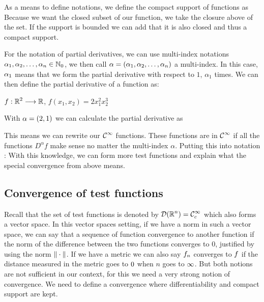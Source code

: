\documentclass[11pt, openright]{book}
\begin{document}
As a means to define notations, we define the compact support of functions as
Because we want the closed subset of our function, we take the closure above of the set. If the support is bounded we can add that it is also closed and thus a compact support.

For the notation of partial derivatives, we can use multi-index notations $\displaystyle{\alpha_1,\alpha_2,\ldots,\alpha_n \in \mathbb{N}_0}$, we then call $\displaystyle{\alpha = (\alpha_1,\alpha_2,\ldots,\alpha_n)}$ a multi-index. In this case, $\displaystyle{\alpha_1}$ means that we form the partial derivative with respect to $1$, $\alpha_1$ times. We can then define the partial derivative of a function as:

\begin{example}
    $\displaystyle{f: \mathbb{R}^2 \longrightarrow \mathbb{R}}$, $f(x_1,x_2)=2x_{1}^{2}x_{2}^{3}$

    With $\displaystyle{\alpha=(2,1)}$ we can calculate the partial derivative as
\end{example}

This means we can rewrite our $\displaystyle{\mathcal{C}^{\infty}}$ functions. These functions are in $\displaystyle{\mathcal{C}^{\infty}}$ if all the functions $D^\alpha f$ make sense no matter the multi-index $\alpha$. Putting this into notation :
With this knowledge, we can form more test functions and explain what the special convergence from above means.

\subsection{Convergence of test functions}

Recall that the set of test functions is denoted by $\displaystyle{\mathcal{D}(\mathbb{R}^n)=\mathcal{C}^{\infty}_{c}}$ which also forms a vector space. In this vector spaces setting, if we have a norm in such a vector space, we can say that a sequence of function convergence to another function if the norm of the difference between the two functions converges to $0$, justified by using the norm $\displaystyle{\|\cdot \|}$.
If we have a metric we can also say $\displaystyle{f_n }$ converges to $\displaystyle{f }$ if the distance measured in the metric goes to $\displaystyle{0}$ when $n$ goes to $\displaystyle{\infty}$.
But both notions are not sufficient in our context, for this we need a very strong notion of convergence. We need to define a convergence where differentiability and compact support are kept.
\end{document}
